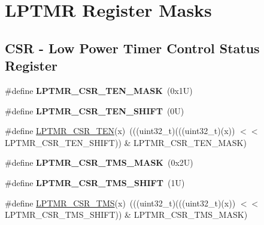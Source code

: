 \hypertarget{group___l_p_t_m_r___register___masks}{}\section{L\+P\+T\+MR Register Masks}
\label{group___l_p_t_m_r___register___masks}
\subsection*{C\+SR -\/ Low Power Timer Control Status Register}
\begin{DoxyCompactItemize}
\item 
\mbox{\label{group___l_p_t_m_r___register___masks_ga4ed197f1cb8d0e954324b4854ff14a83}} 
\#define {\bfseries L\+P\+T\+M\+R\+\_\+\+C\+S\+R\+\_\+\+T\+E\+N\+\_\+\+M\+A\+SK}~(0x1\+U)
\item 
\mbox{\label{group___l_p_t_m_r___register___masks_gada00f24f79b11a91e8404b4531d66733}} 
\#define {\bfseries L\+P\+T\+M\+R\+\_\+\+C\+S\+R\+\_\+\+T\+E\+N\+\_\+\+S\+H\+I\+FT}~(0\+U)
\item 
\#define \mbox{\hyperlink{group___l_p_t_m_r___register___masks_gae18358081bf10e96a1307612264a31fd}{L\+P\+T\+M\+R\+\_\+\+C\+S\+R\+\_\+\+T\+EN}}(x)~(((uint32\+\_\+t)(((uint32\+\_\+t)(x)) $<$$<$ L\+P\+T\+M\+R\+\_\+\+C\+S\+R\+\_\+\+T\+E\+N\+\_\+\+S\+H\+I\+FT)) \& L\+P\+T\+M\+R\+\_\+\+C\+S\+R\+\_\+\+T\+E\+N\+\_\+\+M\+A\+SK)
\item 
\mbox{\label{group___l_p_t_m_r___register___masks_ga57ee593a57d844d7bb4b87c127765558}} 
\#define {\bfseries L\+P\+T\+M\+R\+\_\+\+C\+S\+R\+\_\+\+T\+M\+S\+\_\+\+M\+A\+SK}~(0x2\+U)
\item 
\mbox{\label{group___l_p_t_m_r___register___masks_gaeac406c6a48e15c6ec5784fb891b51b6}} 
\#define {\bfseries L\+P\+T\+M\+R\+\_\+\+C\+S\+R\+\_\+\+T\+M\+S\+\_\+\+S\+H\+I\+FT}~(1\+U)
\item 
\#define \mbox{\hyperlink{group___l_p_t_m_r___register___masks_gae8af700b27a8e6aad5c035eb9181766c}{L\+P\+T\+M\+R\+\_\+\+C\+S\+R\+\_\+\+T\+MS}}(x)~(((uint32\+\_\+t)(((uint32\+\_\+t)(x)) $<$$<$ L\+P\+T\+M\+R\+\_\+\+C\+S\+R\+\_\+\+T\+M\+S\+\_\+\+S\+H\+I\+FT)) \& L\+P\+T\+M\+R\+\_\+\+C\+S\+R\+\_\+\+T\+M\+S\+\_\+\+M\+A\+SK)

\end{DoxyCompactItemize}
